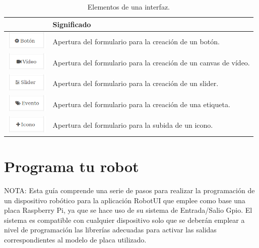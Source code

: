 \begin{table}[H]
  \begin{center}
    \begin{tabular}{|p{2cm}|p{10cm}|}
      \hline
      \centering{Botón} & \qquad \quad Significado \\
      \hline
      \includegraphics[width=2cm]{imagenes/manual-usuario/nuevo-boton.png} & Apertura del formulario para la creación de un botón. \\
      \hline
      \includegraphics[width=2cm]{imagenes/manual-usuario/nuevo-video.png} & Apertura del formulario para la creación de un canvas de vídeo. \\
      \hline
      \includegraphics[width=2cm]{imagenes/manual-usuario/nuevo-slider.png} & Apertura del formulario para la creación de un slider. \\
      \hline
      \includegraphics[width=2cm]{imagenes/manual-usuario/nuevo-evento.png} & Apertura del formulario para la creación de una etiqueta. \\
      \hline
      \includegraphics[width=2cm]{imagenes/manual-usuario/nuevo-icono.png} & Apertura del formulario para la subida de un icono. \\
      \hline
    \end{tabular}
  \end{center}
\caption{Elementos de una interfaz.}
\end{table}


\section{ Programa tu robot }
\label{sec:programacion-robot}

NOTA: Esta guía comprende una serie de pasos para realizar la programación de un dispositivo robótico para la aplicación RobotUI que emplee como base una placa Raspberry Pi, ya que se hace uso de su sistema de Entrada/Salio Gpio. 
El sistema es compatible con cualquier dispositivo solo que se deberán emplear a nivel de programación las librerías adecuadas para activar las salidas correspondientes al modelo de placa utilizado.\\


